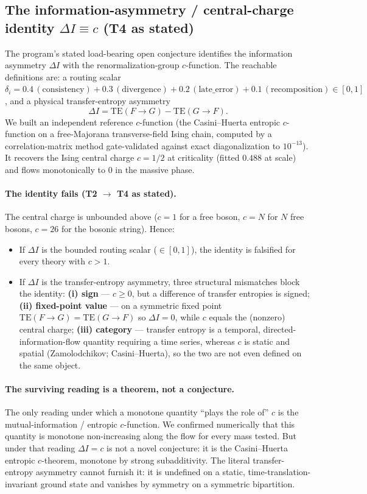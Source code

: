 \documentclass[11pt]{article}
\newcommand{\DI}{\Delta I}
\begin{document}
\subsection{The information-asymmetry / central-charge identity $\DI\equiv c$ (T4 as stated)}
\label{sec:q4}

The program's stated load-bearing open conjecture identifies the information asymmetry
$\DI$ with the renormalization-group $c$-function. The reachable definitions are: a
routing scalar $\delta_i=0.4\,(\text{consistency})+0.3\,(\text{divergence})+
0.2\,(\text{late\_error})+0.1\,(\text{recomposition})\in[0,1]$, and a physical
transfer-entropy asymmetry
\begin{equation}
\DI = \mathrm{TE}(F\!\to\!G)-\mathrm{TE}(G\!\to\!F).
\end{equation}
We built an independent reference $c$-function (the Casini--Huerta entropic
$c$-function on a free-Majorana transverse-field Ising chain, computed by a
correlation-matrix method gate-validated against exact diagonalization to $10^{-13}$).
It recovers the Ising central charge $c=1/2$ at criticality (fitted $0.488$ at scale)
and flows monotonically to $0$ in the massive phase.

\paragraph{The identity fails (T2 $\to$ T4 as stated).} The central charge is unbounded
above ($c=1$ for a free boson, $c=N$ for $N$ free bosons, $c=26$ for the bosonic
string). Hence:
\begin{itemize}[nosep]
\item If $\DI$ is the bounded routing scalar ($\in[0,1]$), the identity is falsified for
every theory with $c>1$.
\item If $\DI$ is the transfer-entropy asymmetry, three structural mismatches block the
identity: \textbf{(i) sign} --- $c\ge0$, but a difference of transfer entropies is signed;
\textbf{(ii) fixed-point value} --- on a symmetric fixed point $\mathrm{TE}(F\!\to\!G)=
\mathrm{TE}(G\!\to\!F)$ so $\DI=0$, while $c$ equals the (nonzero) central charge;
\textbf{(iii) category} --- transfer entropy is a temporal, directed-information-flow
quantity requiring a time series, whereas $c$ is static and spatial (Zamolodchikov;
Casini--Huerta), so the two are not even defined on the same object.
\end{itemize}

\paragraph{The surviving reading is a theorem, not a conjecture.} The only reading under
which a monotone quantity ``plays the role of'' $c$ is the mutual-information / entropic
$c$-function. We confirmed numerically that this quantity is monotone non-increasing
along the flow for every mass tested. But under that reading $\DI=c$ is not a novel
conjecture: it is the Casini--Huerta entropic $c$-theorem, monotone by strong
subadditivity. The literal transfer-entropy asymmetry cannot furnish it: it is undefined
on a static, time-translation-invariant ground state and vanishes by symmetry on a
symmetric bipartition.
\end{document}
